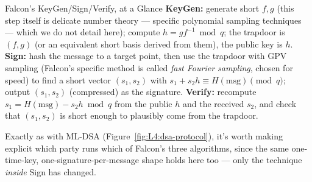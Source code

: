 \begin{rmkbox}{Falcon's KeyGen/Sign/Verify, at a Glance}
\textbf{KeyGen:} generate short $f,g$ (this step itself is delicate number theory --- specific polynomial sampling techniques --- which we do not detail here); compute $h=g f^{-1} \bmod q$; the trapdoor is $(f,g)$ (or an equivalent short basis derived from them), the public key is $h$. \textbf{Sign:} hash the message to a target point, then use the trapdoor with GPV sampling (Falcon's specific method is called \emph{fast Fourier sampling}, chosen for speed) to find a short vector $(s_1,s_2)$ with $s_1 + s_2 h \equiv H(\text{msg}) \pmod q$; output $(s_1,s_2)$ (compressed) as the signature. \textbf{Verify:} recompute $s_1 = H(\text{msg}) - s_2 h \bmod q$ from the public $h$ and the received $s_2$, and check that $(s_1,s_2)$ is short enough to plausibly come from the trapdoor.
\end{rmkbox}

Exactly as with ML-DSA (Figure~\ref{fig:L4:dsa-protocol}), it's worth making explicit which party runs which of Falcon's three algorithms, since the same one-time-key, one-signature-per-message shape holds here too --- only the technique \emph{inside} Sign has changed.

